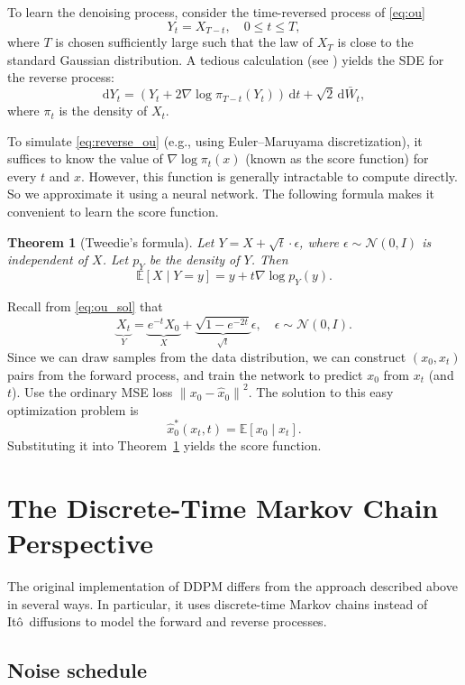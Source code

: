 \documentclass[11pt,a4paper]{article}
\theoremstyle{plain} %
\newtheorem{theorem}{Theorem}
\theoremstyle{definition}
\theoremstyle{remark}
\newcommand{\norm}[1]{\mathopen{}\left\lVert#1\right\rVert}
\newcommand{\N}{\mathbb{N}}
\renewcommand{\d}{\mathrm{d}}
\newcommand{\dt}{\mathrm{d}t}
\newcommand{\E}{\mathbb{E}}
\renewcommand{\N}{\mathcal{N}}
\def\ito{It\^{o}}
\begin{document}
To learn the denoising process, consider the time-reversed process of \eqref{eq:ou}
\[Y_t=X_{T-t},\quad 0\le t\le T,\]
where $T$ is chosen sufficiently large such that the law of $X_T$ is close to the standard Gaussian distribution. A tedious calculation (see \citet{zhang2025sp14}) yields the SDE for the reverse process:
\begin{equation}\label{eq:reverse_ou}
    \d Y_t = (Y_t + 2\nabla\log\pi_{T-t}(Y_t))\,\dt + \sqrt2\,\d\bar W_t,
\end{equation}
where $\pi_t$ is the density of $X_t$.

To simulate \eqref{eq:reverse_ou} (e.g., using Euler--Maruyama discretization), it suffices to know the value of $\nabla\log\pi_t(x)$ (known as the score function) for every $t$ and $x$. However, this function is generally intractable to compute directly. So we approximate it using a neural network. The following formula makes it convenient to learn the score function.

\begin{theorem}[Tweedie's formula]\label{thm:tweedie}
    Let $Y = X + \sqrt t\cdot\epsilon$, where $\epsilon\sim\N(0,I)$ is independent of $X$. Let $p_Y$ be the density of $Y$. Then
    \[\E[X \mid Y=y] = y + t\nabla\log p_Y(y).\]
\end{theorem}

Recall from \eqref{eq:ou_sol} that
\[\underbrace{X_t}_Y = \underbrace{e^{-t}X_0}_X + \underbrace{\sqrt{1-e^{-2t}}}_{\sqrt t}\epsilon,\quad\epsilon\sim\N(0,I).\]
Since we can draw samples from the data distribution, we can construct $(x_0,x_t)$ pairs from the forward process, and train the network to predict $x_0$ from $x_t$ (and $t$). Use the ordinary MSE loss $\norm{x_0-\hat x_0}^2$. The solution to this easy optimization problem is
\[\hat x_0^*(x_t,t) = \E[x_0 \mid x_t].\]
Substituting it into Theorem~\ref{thm:tweedie} yields the score function.

\section{The Discrete-Time Markov Chain Perspective}

The original implementation of DDPM differs from the approach described above in several ways. In particular, it uses discrete-time Markov chains instead of \ito\ diffusions to model the forward and reverse processes.

\subsection{Noise schedule}
\end{document}
